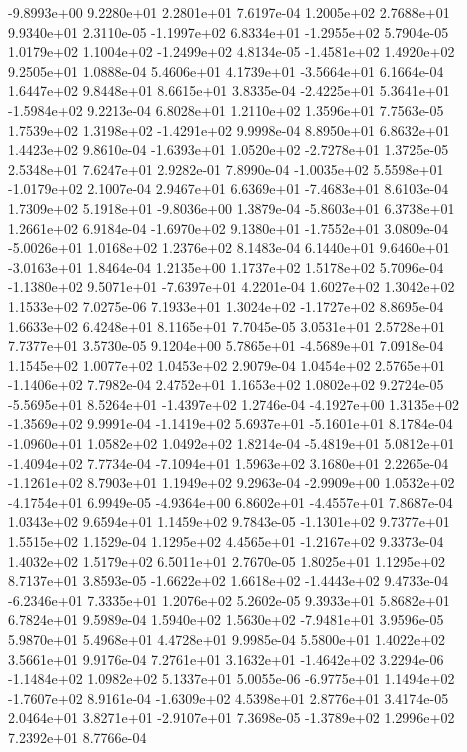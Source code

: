 -9.8993e+00  9.2280e+01  2.2801e+01  7.6197e-04
1.2005e+02 2.7688e+01 9.9340e+01  2.3110e-05
-1.1997e+02  6.8334e+01 -1.2955e+02  5.7904e-05
 1.0179e+02  1.1004e+02 -1.2499e+02  4.8134e-05
-1.4581e+02  1.4920e+02  9.2505e+01  1.0888e-04
 5.4606e+01  4.1739e+01 -3.5664e+01  6.1664e-04
1.6447e+02 9.8448e+01 8.6615e+01  3.8335e-04
-2.4225e+01  5.3641e+01 -1.5984e+02  9.2213e-04
6.8028e+01 1.2110e+02 1.3596e+01  7.7563e-05
 1.7539e+02  1.3198e+02 -1.4291e+02  9.9998e-04
8.8950e+01 6.8632e+01 1.4423e+02  9.8610e-04
-1.6393e+01  1.0520e+02 -2.7278e+01  1.3725e-05
2.5348e+01 7.6247e+01 2.9282e-01  7.8990e-04
-1.0035e+02  5.5598e+01 -1.0179e+02  2.1007e-04
 2.9467e+01  6.6369e+01 -7.4683e+01  8.6103e-04
 1.7309e+02  5.1918e+01 -9.8036e+00  1.3879e-04
-5.8603e+01  6.3738e+01  1.2661e+02  6.9184e-04
-1.6970e+02  9.1380e+01 -1.7552e+01  3.0809e-04
-5.0026e+01  1.0168e+02  1.2376e+02  8.1483e-04
 6.1440e+01  9.6460e+01 -3.0163e+01  1.8464e-04
1.2135e+00 1.1737e+02 1.5178e+02  5.7096e-04
-1.1380e+02  9.5071e+01 -7.6397e+01  4.2201e-04
1.6027e+02 1.3042e+02 1.1533e+02  7.0275e-06
 7.1933e+01  1.3024e+02 -1.1727e+02  8.8695e-04
1.6633e+02 6.4248e+01 8.1165e+01  7.7045e-05
3.0531e+01 2.5728e+01 7.7377e+01  3.5730e-05
 9.1204e+00  5.7865e+01 -4.5689e+01  7.0918e-04
1.1545e+02 1.0077e+02 1.0453e+02  2.9079e-04
 1.0454e+02  2.5765e+01 -1.1406e+02  7.7982e-04
2.4752e+01 1.1653e+02 1.0802e+02  9.2724e-05
-5.5695e+01  8.5264e+01 -1.4397e+02  1.2746e-04
-4.1927e+00  1.3135e+02 -1.3569e+02  9.9991e-04
-1.1419e+02  5.6937e+01 -5.1601e+01  8.1784e-04
-1.0960e+01  1.0582e+02  1.0492e+02  1.8214e-04
-5.4819e+01  5.0812e+01 -1.4094e+02  7.7734e-04
-7.1094e+01  1.5963e+02  3.1680e+01  2.2265e-04
-1.1261e+02  8.7903e+01  1.1949e+02  9.2963e-04
-2.9909e+00  1.0532e+02 -4.1754e+01  6.9949e-05
-4.9364e+00  6.8602e+01 -4.4557e+01  7.8687e-04
1.0343e+02 9.6594e+01 1.1459e+02  9.7843e-05
-1.1301e+02  9.7377e+01  1.5515e+02  1.1529e-04
 1.1295e+02  4.4565e+01 -1.2167e+02  9.3373e-04
1.4032e+02 1.5179e+02 6.5011e+01  2.7670e-05
1.8025e+01 1.1295e+02 8.7137e+01  3.8593e-05
-1.6622e+02  1.6618e+02 -1.4443e+02  9.4733e-04
-6.2346e+01  7.3335e+01  1.2076e+02  5.2602e-05
9.3933e+01 5.8682e+01 6.7824e+01  9.5989e-04
 1.5940e+02  1.5630e+02 -7.9481e+01  3.9596e-05
5.9870e+01 5.4968e+01 4.4728e+01  9.9985e-04
5.5800e+01 1.4022e+02 3.5661e+01  9.9176e-04
 7.2761e+01  3.1632e+01 -1.4642e+02  3.2294e-06
-1.1484e+02  1.0982e+02  5.1337e+01  5.0055e-06
-6.9775e+01  1.1494e+02 -1.7607e+02  8.9161e-04
-1.6309e+02  4.5398e+01  2.8776e+01  3.4174e-05
 2.0464e+01  3.8271e+01 -2.9107e+01  7.3698e-05
-1.3789e+02  1.2996e+02  7.2392e+01  8.7766e-04
